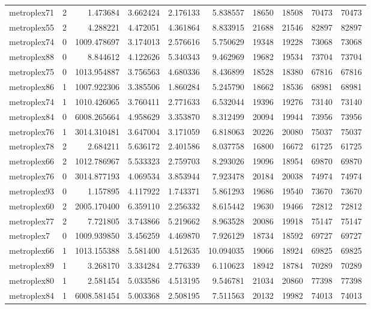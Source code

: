 \begin{longtable}{|l|r|r|r|r|r|r|r|r|r|}
metroplex71 & 2 & 1.473684 & 3.662424 & 2.176133 & 5.838557 & 18650 & 18508 & 70473 & 70473 \\
metroplex55 & 2 & 4.288221 & 4.472051 & 4.361864 & 8.833915 & 21688 & 21546 & 82897 & 82897 \\
metroplex74 & 0 & 1009.478697 & 3.174013 & 2.576616 & 5.750629 & 19348 & 19228 & 73068 & 73068 \\
metroplex88 & 0 & 8.844612 & 4.122626 & 5.340343 & 9.462969 & 19682 & 19534 & 73704 & 73704 \\
metroplex75 & 0 & 1013.954887 & 3.756563 & 4.680336 & 8.436899 & 18528 & 18380 & 67816 & 67816 \\
metroplex86 & 1 & 1007.922306 & 3.385506 & 1.860284 & 5.245790 & 18662 & 18536 & 68981 & 68981 \\
metroplex74 & 1 & 1010.426065 & 3.760411 & 2.771633 & 6.532044 & 19396 & 19276 & 73140 & 73140 \\
metroplex84 & 0 & 6008.265664 & 4.958629 & 3.353870 & 8.312499 & 20094 & 19944 & 73956 & 73956 \\
metroplex76 & 1 & 3014.310481 & 3.647004 & 3.171059 & 6.818063 & 20226 & 20080 & 75037 & 75037 \\
metroplex78 & 2 & 2.684211 & 5.636172 & 2.401586 & 8.037758 & 16800 & 16672 & 61725 & 61725 \\
metroplex66 & 2 & 1012.786967 & 5.533323 & 2.759703 & 8.293026 & 19096 & 18954 & 69870 & 69870 \\
metroplex76 & 0 & 3014.877193 & 4.069534 & 3.853944 & 7.923478 & 20184 & 20038 & 74974 & 74974 \\
metroplex93 & 0 & 1.157895 & 4.117922 & 1.743371 & 5.861293 & 19686 & 19540 & 73670 & 73670 \\
metroplex60 & 2 & 2005.170400 & 6.359110 & 2.256332 & 8.615442 & 19630 & 19466 & 72812 & 72812 \\
metroplex77 & 2 & 7.721805 & 3.743866 & 5.219662 & 8.963528 & 20086 & 19918 & 75147 & 75147 \\
metroplex7 & 0 & 1009.939850 & 3.456259 & 4.469870 & 7.926129 & 18734 & 18592 & 69727 & 69727 \\
metroplex66 & 1 & 1013.155388 & 5.581400 & 4.512635 & 10.094035 & 19066 & 18924 & 69825 & 69825 \\
metroplex89 & 1 & 3.268170 & 3.334284 & 2.776339 & 6.110623 & 18942 & 18784 & 70289 & 70289 \\
metroplex80 & 1 & 2.581454 & 5.033586 & 4.513195 & 9.546781 & 21034 & 20860 & 77398 & 77398 \\
metroplex84 & 1 & 6008.581454 & 5.003368 & 2.508195 & 7.511563 & 20132 & 19982 & 74013 & 74013 \\

\end{longtable}

